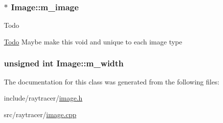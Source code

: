 \subsubsection[{m\+\_\+image}]{$\ast$ Image\+::m\+\_\+image\hspace{0.3cm}{\ttfamily [protected]}}\label{classImage_a917680d514864d303cd210fcf3d52299}
\begin{DoxyRefDesc}{Todo}
\item[\hyperlink{todo__todo000001}{Todo}]Maybe make this void and unique to each image type \end{DoxyRefDesc}
\hypertarget{classImage_a121b435401e6fc86901514d000f7df37}{}
\subsubsection[{m\+\_\+width}]{\setlength{\rightskip}{0pt plus 5cm}unsigned int Image\+::m\+\_\+width\hspace{0.3cm}{\ttfamily [protected]}}\label{classImage_a121b435401e6fc86901514d000f7df37}


The documentation for this class was generated from the following files\+:\begin{DoxyCompactItemize}
\item 
include/raytracer/\hyperlink{image_8h}{image.\+h}\item 
src/raytracer/\hyperlink{image_8cpp}{image.\+cpp}\end{DoxyCompactItemize}
